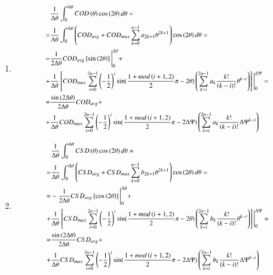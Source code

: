 \documentclass[review]{elsarticle}
\begin{document}
\begin{enumerate}
\item
\begin{equation}
\footnotesize
\begin{aligned}
&\frac{1}{\Delta\theta}\int_{0}^{\Delta\theta}COD\left(\theta\right)\cos\left(2\theta\right)d\theta=\\
=&\frac{1}{\Delta\theta}\int_{0}^{\Delta\theta}\left(COD_{avg}+COD_{max}\sum_{k=0}^{n-1}a_{2k+1}\theta^{2k+1}\right)\cos\left(2\theta\right)d\theta=\\
=&\frac{1}{2\Delta\theta}COD_{avg}\left[\sin\left(2\theta\right)\right]\Bigg\rvert_{0}^{\Delta\theta}+\\
+&\frac{1}{\Delta\theta}\left[COD_{max}\sum_{i=0}^{2n-1}\left(-\frac{1}{2}\right)^{i}\sin(\frac{1+mod\left(i+1,2\right)}{2}\pi-2\theta)\left(\sum_{k=i}^{2n-1}a_{k}\frac{k!}{\left(k-i\right)!}\theta^{k-i}\right)\right]\Bigg\rvert_{0}^{\Delta\Psi}=\\
=&\frac{\sin\left(2\Delta\theta\right)}{2\Delta\theta}COD_{avg}+\\
+&\frac{1}{\Delta\theta}COD_{max}\sum_{i=0}^{2n-1}\left(-\frac{1}{2}\right)^{i}\sin(\frac{1+mod\left(i+1,2\right)}{2}\pi-2\Delta\Psi)\left(\sum_{k=i}^{2n-1}a_{k}\frac{k!}{\left(k-i\right)!}\Delta\Psi^{k-i}\right)
\end{aligned}
\end{equation}

\item
\begin{equation}
\footnotesize
\begin{aligned}
&\frac{1}{\Delta\theta}\int_{0}^{\Delta\theta}CSD\left(\theta\right)\cos\left(2\theta\right)d\theta=\\
=&\frac{1}{\Delta\theta}\int_{0}^{\Delta\theta}\left(CSD_{avg}+CSD_{max}\sum_{k=0}^{n-1}b_{2k+1}\theta^{2k+1}\right)\cos\left(2\theta\right)d\theta=\\
=&-\frac{1}{2\Delta\theta}CSD_{avg}\left[\cos\left(2\theta\right)\right]\Bigg\rvert_{0}^{\Delta\theta}+\\
+&\frac{1}{\Delta\theta}\left[CSD_{max}\sum_{i=0}^{2n-1}\left(-\frac{1}{2}\right)^{i}\sin(\frac{1+mod\left(i+1,2\right)}{2}\pi-2\theta)\left(\sum_{k=i}^{2n-1}b_{k}\frac{k!}{\left(k-i\right)!}\theta^{k-i}\right)\right]\Bigg\rvert_{0}^{\Delta\Psi}=\\
=&\frac{\sin\left(2\Delta\theta\right)}{2\Delta\theta}CSD_{avg}+\\
+&\frac{1}{\Delta\theta}CSD_{max}\sum_{i=0}^{2n-1}\left(-\frac{1}{2}\right)^{i}\sin(\frac{1+mod\left(i+1,2\right)}{2}\pi-2\Delta\Psi)\left(\sum_{k=i}^{2n-1}b_{k}\frac{k!}{\left(k-i\right)!}\Delta\Psi^{k-i}\right)
\end{aligned}
\end{equation}

\end{enumerate}
\end{document}

